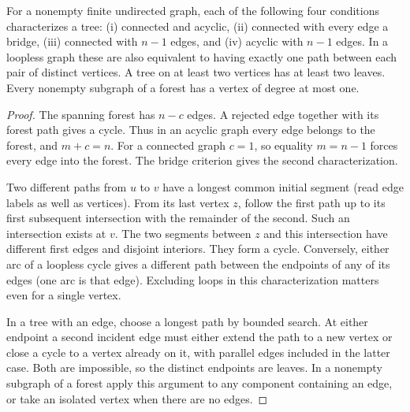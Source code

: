 \begin{theorem}\leavevmode\label{sttree}
For a nonempty finite undirected graph, each of the following four conditions characterizes a tree: (i) connected and acyclic, (ii) connected with every edge a bridge, (iii) connected with $n-1$ edges, and (iv) acyclic with $n-1$ edges. In a loopless graph these are also equivalent to having exactly one path between each pair of distinct vertices. A tree on at least two vertices has at least two leaves. Every nonempty subgraph of a forest has a vertex of degree at most one.
\end{theorem}
\begin{proof}
The spanning forest has $n-c$ edges. A rejected edge together with its forest path gives a cycle. Thus in an acyclic graph every edge belongs to the forest, and $m+c=n$. For a connected graph $c=1$, so equality $m=n-1$ forces every edge into the forest. The bridge criterion gives the second characterization.

Two different paths from $u$ to $v$ have a longest common initial segment (read edge labels as well as vertices). From its last vertex $z$, follow the first path up to its first subsequent intersection with the remainder of the second. Such an intersection exists at $v$. The two segments between $z$ and this intersection have different first edges and disjoint interiors. They form a cycle. Conversely, either arc of a loopless cycle gives a different path between the endpoints of any of its edges (one arc is that edge). Excluding loops in this characterization matters even for a single vertex.

In a tree with an edge, choose a longest path by bounded search. At either endpoint a second incident edge must either extend the path to a new vertex or close a cycle to a vertex already on it, with parallel edges included in the latter case. Both are impossible, so the distinct endpoints are leaves. In a nonempty subgraph of a forest apply this argument to any component containing an edge, or take an isolated vertex when there are no edges.
\end{proof}

